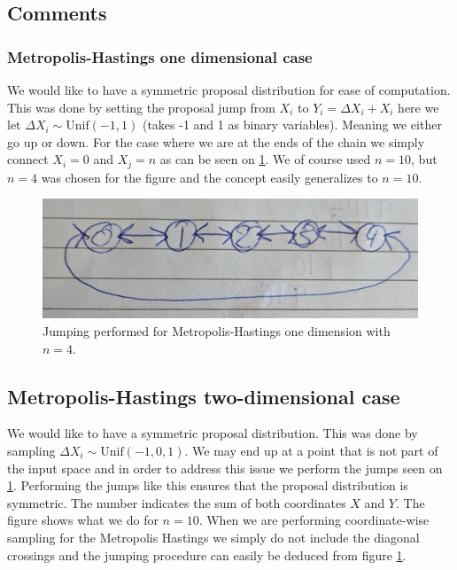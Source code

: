 \subsection*{Comments}

\subsubsection*{Metropolis-Hastings one dimensional case}
We would like to have a symmetric proposal distribution for ease of computation. This was done by setting the proposal jump from $X_i$ to $Y_i = \Delta X_i + X_i$ here we let $\Delta X_i \sim \text{Unif}(-1,1)$ (takes -1 and 1 as binary variables). Meaning we either go up or down. For the case where we are at the ends of the chain we simply connect $X_i=0$ and $X_j=n$ as can be seen on \ref{fig:ex62}. We of course used $n=10$, but $n=4$ was chosen for the figure and the concept easily generalizes to $n=10$. 


\begin{figure}[H]
    \centering
    \includegraphics[width=\linewidth]{figures/pic2.jpg}
    \caption{Jumping performed for Metropolis-Hastings one dimension with $n=4$.}
    \label{fig:ex62}
\end{figure}

\subsection*{Metropolis-Hastings two-dimensional case}
We would like to have a symmetric proposal distribution. This was done by sampling $\Delta X_i \sim \text{Unif}(-1,0,1)$. We may end up at a point that is not part of the input space and in order to address this issue we perform the jumps seen on \ref{fig:ex62}. Performing the jumps like this ensures that the proposal distribution is symmetric. The number indicates the sum of both coordinates $X$ and $Y$. The figure shows what we do for $n=10$. When we are performing coordinate-wise sampling for the Metropolis Hastings we simply do not include the diagonal crossings and the jumping procedure can easily be deduced from figure \ref{fig:ex62}. 

